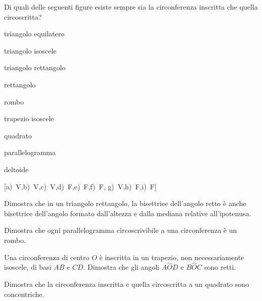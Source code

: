 \begin{esercizio}
\label{ese:5.43}
Di quali delle seguenti figure esiste sempre sia la circonferenza 
inscritta che quella circoscritta?
\begin{multicols}{2}
\begin{enumeratea}
\item triangolo equilatero\hfill\boxV\quad\boxF
\item triangolo isoscele\hfill\boxV\quad\boxF
\item triangolo rettangolo\hfill\boxV\quad\boxF
\item rettangolo\hfill\boxV\quad\boxF
\item rombo\hfill\boxV\quad\boxF
\item trapezio isoscele\hfill\boxV\quad\boxF
\item quadrato\hfill\boxV\quad\boxF
\item parallelogramma\hfill\boxV\quad\boxF
\item deltoide\hfill\boxV\quad\boxF
\end{enumeratea}
\end{multicols}
\hfill [a)~V,\quad b)~V,\quad c)~V,\quad d)~F,\quad e)~F,\quad f)~F,\quad 
g)~V,\quad h)~F,\quad i)~F]
\end{esercizio}

\begin{esercizio}
\label{ese:5.51}
Dimostra che in un triangolo rettangolo, la bisettrice dell'angolo 
retto è anche bisettrice dell'angolo formato dall'altezza e dalla 
mediana relative all'ipotenusa.
\end{esercizio}

\begin{esercizio}
\label{ese:5.52}
Dimostra che ogni parallelogramma circoscrivibile a una circonferenza 
è un rombo.
\end{esercizio}

\begin{esercizio}
\label{ese:5.53}
Una circonferenza di centro $O$ è inscritta in un trapezio, non 
necessariamente isoscele, di basi $AB$ e $CD$. Dimostra che gli 
angoli $A\widehat{O}D$ e $B\widehat{O}C$ sono retti.
\end{esercizio}

\begin{esercizio}
\label{ese:5.54}
Dimostra che la circonferenza inscritta e quella circoscritta a un 
quadrato sono concentriche.
\end{esercizio}



